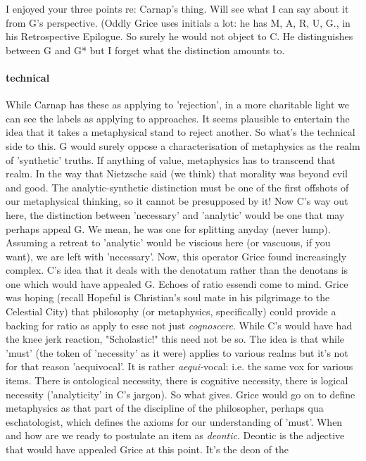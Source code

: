 \documentclass[10pt,titlepage]{book}
\begin{document}
{I enjoyed your three points re: Carnap's thing. Will see what I can say  
about it from G's perspective. (Oddly Grice uses initials a lot: he has M, A, 
R,  U, G., in his Retrospective Epilogue. So surely he would not object to 
C. He  distinguishes between G and G* but I forget what the distinction 
amounts  to.
 
\paragraph{technical}

While Carnap has these as applying to 'rejection', in a more  
charitable light we can see the labels as applying to approaches. It seems  
plausible to entertain the idea that it takes a metaphysical stand to reject  
another. So what's the technical side to this. G would surely oppose a  
characterisation of metaphysics as the realm of 'synthetic' truths. If anything  
of value, metaphysics has to transcend that realm. In the way that 
Nietzsche  said (we think) that morality was beyond evil and good. The 
analytic-synthetic  distinction must be one of the first offshots of our metaphysical 
thinking, so  it cannot be presupposed by it! Now C's way out here, the 
distinction between  'necessary' and 'analytic' would be one that may perhaps 
appeal G. We mean, he  was one for splitting anyday (never lump). Assuming a 
retreat to 'analytic'  would be viscious here (or vascuous, if you want), we 
are left with 'necessary'.  Now, this operator Grice found increasingly 
complex. C's idea that it deals with  the denotatum rather than the denotans is 
one which would have appealed G.  Echoes of ratio essendi come to mind. Grice 
was hoping (recall Hopeful is  Christian's soul mate in his pilgrimage to 
the Celestial City) that philosophy  (or metaphysics, specifically) could 
provide a backing for ratio as apply to  esse not just {\it cognoscere}. While 
C's would have had the knee jerk reaction,  "Scholastic!" this need not be so. 
The idea is that while 'must' (the token of  'necessity' as it were) 
applies to various realms but it's not for that reason  'aequivocal'. It is rather 
{\it aequi-}vocal: i.e. the same vox for various items.  There is ontological 
necessity, there is cognitive necessity, there is logical  necessity 
('analyticity' in C's jargon). So what gives. Grice would go on to  define 
metaphysics as that part of the discipline of the philosopher, perhaps  qua 
eschatologist, which defines the axioms for our understanding of 'must'.  When and 
how are we ready to postulate an item as {\it deontic}. Deontic is the  
adjective that would have appealed Grice at this point. It's the deon of the  

}
\end{document}

